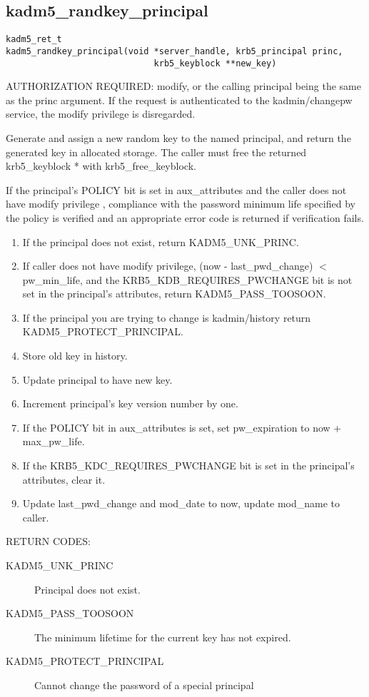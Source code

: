\subsection{kadm5_randkey_principal}

\begin{verbatim}
kadm5_ret_t
kadm5_randkey_principal(void *server_handle, krb5_principal princ,
                             krb5_keyblock **new_key)
\end{verbatim}

AUTHORIZATION REQUIRED: modify, or the calling principal being the
same as the princ argument.  If the request is authenticated to the
kadmin/changepw service, the modify privilege is disregarded.

Generate and assign a new random key to the named principal, and
return the generated key in allocated storage.  The caller must free
the returned krb5_keyblock * with krb5_free_keyblock.

If the principal's POLICY bit is set in aux_attributes and the caller does
not have modify privilege , compliance with the password minimum life
specified by the policy is verified and an appropriate error code is returned
if verification fails. 

\begin{enumerate}
\item If the principal does not exist, return KADM5_UNK_PRINC.
\item If caller does not have modify privilege, (now - last_pwd_change) $<$
pw_min_life, and the KRB5_KDB_REQUIRES_PWCHANGE bit is not set in the
principal's attributes, return KADM5_PASS_TOOSOON.
\item If the principal you are trying to change is kadmin/history return
KADM5_PROTECT_PRINCIPAL.
\item Store old key in history.
\item Update principal to have new key.
\item Increment principal's key version number by one.
\item If the POLICY bit in aux_attributes is set, set pw_expiration to
now + max_pw_life.
\item If the KRB5_KDC_REQUIRES_PWCHANGE bit is set in the principal's
attributes, clear it.
\item Update last_pwd_change and mod_date to now, update mod_name to
caller.
\end{enumerate}

RETURN CODES:

\begin{description}
\item[KADM5_UNK_PRINC] Principal does not exist.
\item[KADM5_PASS_TOOSOON] The minimum lifetime for the current
key has not expired.
\item[KADM5_PROTECT_PRINCIPAL] Cannot change the password of a special
principal
\end{description}

